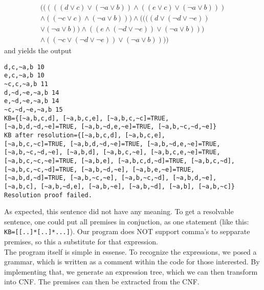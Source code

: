 \documentclass{report}
\begin{document}
\begin{itemize}
\begin{align*}
    (((((d \lor c) \lor (\neg a \lor b)) \land ((e \lor c) \lor (\neg a \lor b)))\\ \land ((\neg c \lor c) \land (\neg a \lor b))) \land ((((d \lor(\neg d \lor \neg e))\\\lor(\neg a \lor b))\land ((e \land(\neg d \lor \neg e)) \lor (\neg a \lor b)))\\\land((\neg c \lor (\neg d \lor \neg e))\lor(\neg a \lor b))))
    \end{align*}
    and yields the output
    \begin{verbatim}
d,c,~a,b 10
e,c,~a,b 10
~c,c,~a,b 11
d,~d,~e,~a,b 14
e,~d,~e,~a,b 14
~c,~d,~e,~a,b 15
KB={[~a,b,c,d], [~a,b,c,e], [~a,b,c,~c]=TRUE, 
[~a,b,d,~d,~e]=TRUE, [~a,b,~d,e,~e]=TRUE, [~a,b,~c,~d,~e]}
KB after resolution={[~a,b,c,d], [~a,b,c,e], 
[~a,b,c,~c]=TRUE, [~a,b,d,~d,~e]=TRUE, [~a,b,~d,e,~e]=TRUE, 
[~a,b,~c,~d,~e], [~a,b,d], [~a,b,c,~e], [~a,b,c,e,~e]=TRUE, 
[~a,b,c,~c,~e]=TRUE, [~a,b,e], [~a,b,c,d,~d]=TRUE, [~a,b,c,~d], 
[~a,b,c,~c,~d]=TRUE, [~a,b,~d,~e], [~a,b,e,~e]=TRUE, 
[~a,b,d,~d]=TRUE, [~a,b,~c,~e], [~a,b,~c,~d], [~a,b,d,~e], 
[~a,b,c], [~a,b,~d,e], [~a,b,~e], [~a,b,~d], [~a,b], [~a,b,~c]}
Resolution proof failed.
    \end{verbatim}
    As expected, this sentence did not have any meaning. To get a resolvable sentence, one could put all premises in conjuction, as one statement (like this: \verb|KB=[[..]*[..]*...]|). Our program does NOT support comma's to sepparate premises, so this a substitute for that expression.\\
    The program itself is simple in essense. To recognize the expressions, we posed a grammar, which is written as a comment within the code for those interested. By implementing that, we generate an expression tree, which we can then transform into CNF. The premises can then be extracted from the CNF.
\end{itemize}
\end{document}
